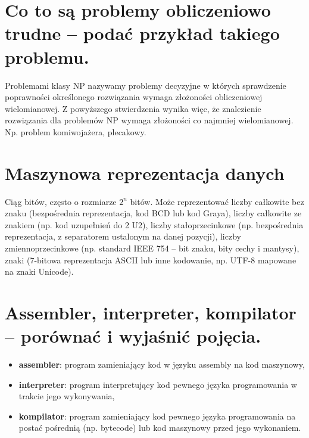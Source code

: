 \documentclass[12pt,a4paper]{article}
\begin{document}
	\section{Co to są problemy obliczeniowo trudne – podać przykład takiego problemu.}
	Problemami klasy NP nazywamy problemy decyzyjne w których sprawdzenie poprawności określonego rozwiązania wymaga złożoności obliczeniowej wielomianowej. Z powyższego stwierdzenia wynika więc, że znalezienie rozwiązania dla problemów NP wymaga złożoności co najmniej wielomianowej. Np. problem komiwojażera, plecakowy.

	\section{Maszynowa reprezentacja danych}
	Ciąg bitów, często o rozmiarze $2^n$ bitów. Może reprezentować liczby całkowite bez znaku (bezpośrednia reprezentacja, kod BCD lub kod Graya), liczby całkowite ze znakiem (np. kod uzupełnień do 2 U2), liczby stałoprzecinkowe (np. bezpośrednia reprezentacja, z separatorem ustalonym na danej pozycji), liczby zmiennoprzecinkowe (np. standard IEEE 754 -- bit znaku, bity cechy i mantysy), znaki (7-bitowa reprezentacja ASCII lub inne kodowanie, np. UTF-8 mapowane na znaki Unicode).

	\section{Assembler, interpreter, kompilator – porównać i wyjaśnić pojęcia.}
	\begin{itemize}	
		\item \textbf{assembler}: program zamieniający kod w języku assembly na kod maszynowy,
		\item \textbf{interpreter}: program interpretujący kod pewnego języka programowania w trakcie jego wykonywania,
		\item \textbf{kompilator}: program zamieniający kod pewnego języka programowania na postać pośrednią (np. bytecode) lub kod maszynowy przed jego wykonaniem.
	\end{itemize}	
\end{document}
